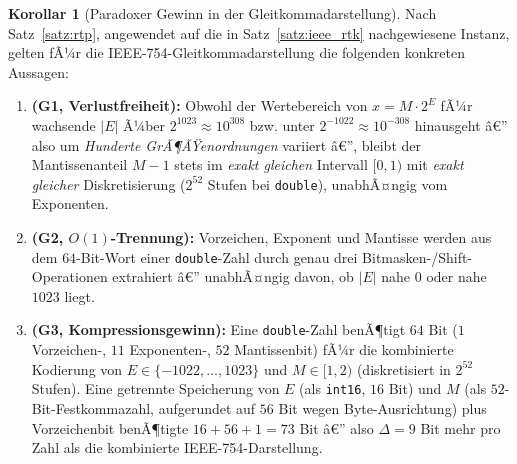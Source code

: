﻿\documentclass[a4paper,12pt]{article}
\theoremstyle{definition}
\newtheorem{korollar}{Korollar}
\begin{document}
\begin{korollar}[Paradoxer Gewinn in der Gleitkommadarstellung]
\label{kor:floatparadox}
	Nach Satz~\ref{satz:rtp}, angewendet auf die in
	Satz~\ref{satz:ieee_rtk} nachgewiesene Instanz, gelten fÃ¼r die
	IEEE-754-Gleitkommadarstellung die folgenden konkreten Aussagen:
	\begin{enumerate}[label=(F\arabic*)]
		\item \textbf{(G1, Verlustfreiheit):} Obwohl der Wertebereich von
		      $x=M\cdot2^E$ fÃ¼r wachsende $|E|$ Ã¼ber $2^{1023}\approx10^{308}$
		      bzw. unter $2^{-1022}\approx10^{-308}$ hinausgeht â€” also um
		      \emph{Hunderte GrÃ¶ÃŸenordnungen} variiert â€”, bleibt der
		      Mantissenanteil $M-1$ stets im \emph{exakt gleichen} Intervall
		      $[0,1)$ mit \emph{exakt gleicher} Diskretisierung
		      ($2^{52}$ Stufen bei \texttt{double}), unabhÃ¤ngig vom Exponenten.
		\item \textbf{(G2, $O(1)$-Trennung):} Vorzeichen, Exponent und
		      Mantisse werden aus dem $64$-Bit-Wort einer
		      \texttt{double}-Zahl durch genau drei
		      Bitmasken-/Shift-Operationen extrahiert â€” unabhÃ¤ngig davon, ob
		      $|E|$ nahe $0$ oder nahe $1023$ liegt.
		\item \textbf{(G3, Kompressionsgewinn):} Eine \texttt{double}-Zahl
		      benÃ¶tigt $64$ Bit ($1$ Vorzeichen-, $11$ Exponenten-, $52$
		      Mantissenbit) fÃ¼r die kombinierte Kodierung von $E\in\{-1022,\ldots,1023\}$
		      und $M\in[1,2)$ (diskretisiert in $2^{52}$ Stufen). Eine
		      getrennte Speicherung von $E$ (als \texttt{int16}, $16$ Bit)
		      und $M$ (als $52$-Bit-Festkommazahl, aufgerundet auf $56$ Bit
		      wegen Byte-Ausrichtung) plus Vorzeichenbit benÃ¶tigte
		      $16+56+1=73$ Bit â€” also $\Delta=9$ Bit mehr pro Zahl als die
		      kombinierte IEEE-754-Darstellung.
	\end{enumerate}
\end{korollar}
\end{document}
